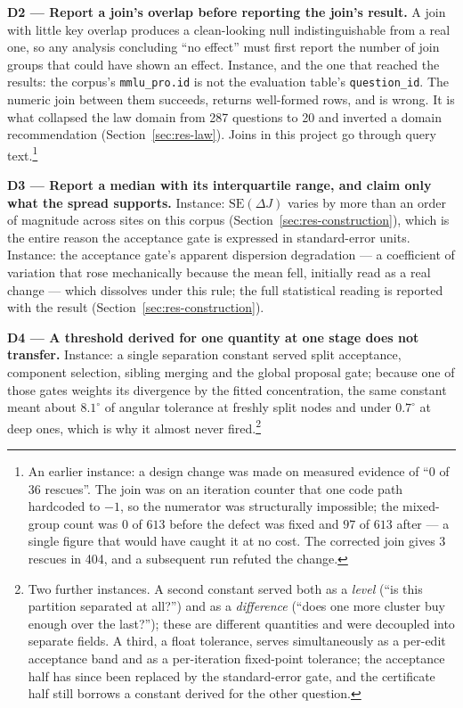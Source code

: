 \textbf{D2 --- Report a join's overlap before reporting the join's
result.}
A join with little key overlap produces a clean-looking null
indistinguishable from a real one, so any analysis concluding ``no
effect'' must first report the number of join groups that could have
shown an effect.
Instance, and the one that reached the results: the corpus's
\texttt{mmlu\_pro.id} is not the evaluation table's
\texttt{question\_id}. The numeric join between them succeeds, returns
well-formed rows, and is wrong. It is what collapsed the law domain
from 287 questions to 20 and inverted a domain recommendation
(Section~\ref{sec:res-law}). Joins in this project go through query
text.\footnote{An earlier instance: a design change was made on
measured evidence of ``0 of 36 rescues''. The join was on an iteration
counter that one code path hardcoded to $-1$, so the numerator was
structurally impossible; the mixed-group count was $0$ of $613$ before
the defect was fixed and $97$ of $613$ after --- a single figure that
would have caught it at no cost. The corrected join gives 3 rescues in
404, and a subsequent run refuted the change.}

\textbf{D3 --- Report a median with its interquartile range, and claim
only what the spread supports.}
Instance: $\mathrm{SE}(\Delta J)$ varies by more than an order of
magnitude across sites on this corpus
(Section~\ref{sec:res-construction}), which is the entire reason the
acceptance gate is expressed in standard-error units.
Instance: the acceptance gate's apparent dispersion degradation --- a
coefficient of variation that rose mechanically because the mean fell,
initially read as a real change --- which dissolves under this rule;
the full statistical reading is reported with the result
(Section~\ref{sec:res-construction}).

\textbf{D4 --- A threshold derived for one quantity at one stage does
not transfer.}
Instance: a single separation constant served split acceptance,
component selection, sibling merging and the global proposal gate;
because one of those gates weights its divergence by the fitted
concentration, the same constant meant about $8.1^{\circ}$ of angular
tolerance at freshly split nodes and under $0.7^{\circ}$ at deep
ones, which is why it almost never fired.\footnote{Two further
instances. A second constant served both as a \emph{level} (``is this
partition separated at all?'') and as a \emph{difference} (``does one
more cluster buy enough over the last?''); these are different
quantities and were decoupled into separate fields. A third, a float
tolerance, serves simultaneously as a per-edit acceptance band and as
a per-iteration fixed-point tolerance; the acceptance half has since
been replaced by the standard-error gate, and the certificate half
still borrows a constant derived for the other question.}

